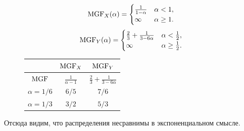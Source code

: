 \solution{}
    \begin{equation}
        \operatorname{MGF}_X(\alpha) = \begin{cases}
            \frac{1}{1-\alpha} & \alpha < 1, \\
            \infty & \alpha \geq 1.
        \end{cases}
    \end{equation}
    \begin{equation}
        \operatorname{MGF}_Y(\alpha) =\begin{cases}
            \frac{2}{3} + \frac{1}{3-6\alpha} & \alpha < \frac{1}{2}, \\
            \infty & \alpha \geq \frac{1}{2}.
        \end{cases}
    \end{equation}
    \begin{figure}[htbp]
        \begin{tabular}{|c|c|c|}\hline
              & $\operatorname{MGF}_X$ & $\operatorname{MGF}_Y$ \\\hline
            $\operatorname{MGF}$ & $\frac{1}{\alpha-1}$ & $\frac{2}{3} + \frac{1}{3- 6\alpha}$ \\\hline
            $\alpha = 1/6$ & $6/5$ & $7/6$ \\\hline
            $\alpha = 1/3$ & $3/2$ & $5/3$\\\hline
        \end{tabular}
    \end{figure}
    Отсюда видим, что распределения несравнимы в экспоненциальном смысле.